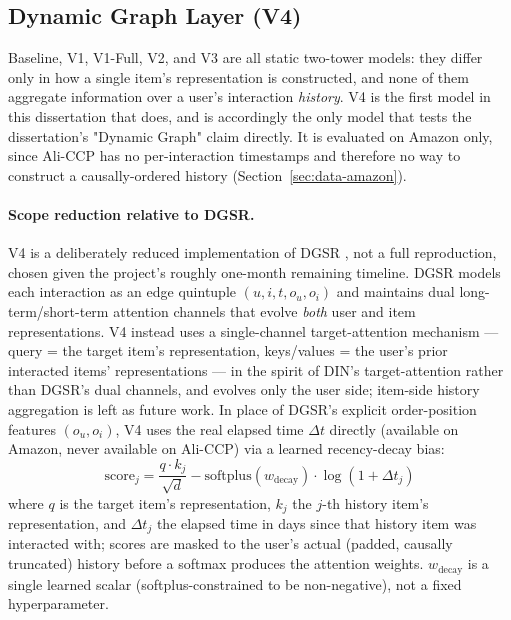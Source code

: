 \subsection{Dynamic Graph Layer (V4)}
\label{sec:v4}

Baseline, V1, V1-Full, V2, and V3 are all static two-tower models: they differ only in how a single item's representation is constructed, and none of them aggregate information over a user's interaction \emph{history}. V4 is the first model in this dissertation that does, and is accordingly the only model that tests the dissertation's "Dynamic Graph" claim directly. It is evaluated on Amazon only, since Ali-CCP has no per-interaction timestamps and therefore no way to construct a causally-ordered history (Section~\ref{sec:data-amazon}).

\paragraph{Scope reduction relative to DGSR.} V4 is a deliberately reduced implementation of DGSR \cite{zhang2022dgsr}, not a full reproduction, chosen given the project's roughly one-month remaining timeline. DGSR models each interaction as an edge quintuple $(u, i, t, o_u, o_i)$ and maintains dual long-term/short-term attention channels that evolve \emph{both} user and item representations. V4 instead uses a single-channel target-attention mechanism --- query = the target item's representation, keys/values = the user's prior interacted items' representations --- in the spirit of DIN's target-attention \cite{zhou2018din} rather than DGSR's dual channels, and evolves only the user side; item-side history aggregation is left as future work. In place of DGSR's explicit order-position features $(o_u, o_i)$, V4 uses the real elapsed time $\Delta t$ directly (available on Amazon, never available on Ali-CCP) via a learned recency-decay bias:
\[
\text{score}_j = \frac{q \cdot k_j}{\sqrt{d}} - \text{softplus}(w_{\text{decay}}) \cdot \log(1 + \Delta t_j)
\]
where $q$ is the target item's representation, $k_j$ the $j$-th history item's representation, and $\Delta t_j$ the elapsed time in days since that history item was interacted with; scores are masked to the user's actual (padded, causally truncated) history before a softmax produces the attention weights. $w_{\text{decay}}$ is a single learned scalar (softplus-constrained to be non-negative), not a fixed hyperparameter.

